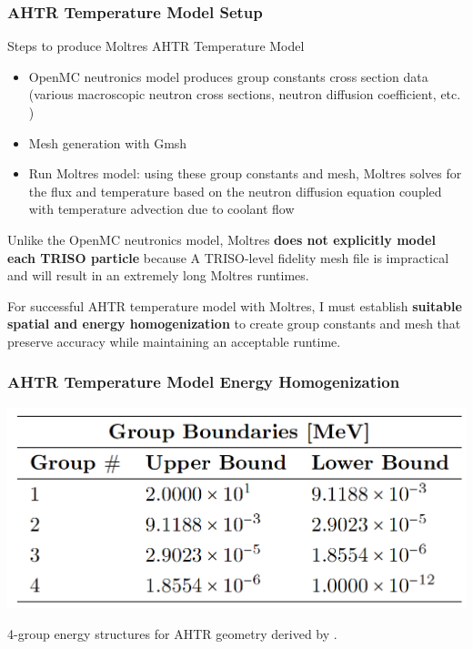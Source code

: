 \begin{frame}
    \frametitle{AHTR Temperature Model Setup}
    Steps to produce Moltres AHTR Temperature Model
        \begin{itemize}
          \item OpenMC neutronics model produces group constants cross section data 
          (various macroscopic neutron cross sections, neutron diffusion coefficient, etc. )
          \item Mesh generation with Gmsh \cite{geuzaine_gmsh_2009}
          \item Run Moltres model: using these group constants and mesh, Moltres solves for the 
          flux and temperature based on the neutron diffusion equation coupled with temperature 
          advection due to coolant flow
        \end{itemize}

    Unlike the OpenMC neutronics model, Moltres \textbf{does not explicitly model each TRISO 
    particle} because A TRISO-level fidelity mesh file is impractical and will result in an 
    extremely long Moltres runtimes. 
    
    \vspace{0.3cm}
    For successful AHTR temperature model with Moltres, I must establish 
    \textbf{suitable spatial and energy homogenization} to create group constants and mesh 
    that preserve accuracy while maintaining an acceptable runtime.
\end{frame}

\begin{frame}
    \frametitle{AHTR Temperature Model Energy Homogenization}
        \begin{table}[]
            \centering
            \begin{minipage}[c]{0.6\textwidth}
                \centering
                \includegraphics[width=0.8\linewidth]{figures/ahtr-energy-discr.png}
            \end{minipage}\hfill
            \begin{minipage}[c]{0.4\textwidth}
            \caption{4-group energy structures for AHTR geometry 
            derived by \cite{gentry_development_2016}.}
        \end{minipage}
        \end{table}
\end{frame}

